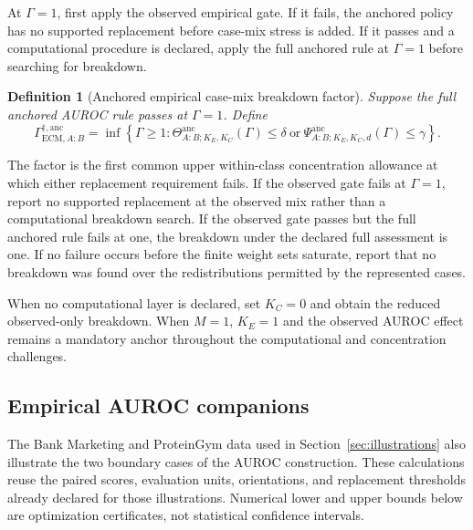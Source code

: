 \documentclass[11pt]{article}
\newcommand{\Psianc}{\Psi^{\mathrm{anc}}}
\newcommand{\Thetaanc}{\Theta^{\mathrm{anc}}}
\newtheorem{definition}{Definition}
\theoremstyle{remark}
\begin{document}
At $\Gamma=1$, first apply the observed empirical gate. If it fails, the
anchored policy has no supported replacement before case-mix stress is added.
If it passes and a computational procedure is declared, apply the full
anchored rule at $\Gamma=1$ before searching for breakdown.

\begin{definition}[Anchored empirical case-mix breakdown factor]
Suppose the full anchored AUROC rule passes at $\Gamma=1$. Define
\begin{equation}
\Gamma_{\mathrm{ECM},A:B}^{\dagger,\mathrm{anc}}
=
\inf\left\{\Gamma\geq1:
\Thetaanc_{A:B;K_E,K_C}(\Gamma)\leq\delta
\ \text{or}\ 
\Psianc_{A:B;K_E,K_C,d}(\Gamma)\leq\gamma
\right\}.
\label{eq:anchored-breakdown}
\end{equation}
\end{definition}

The factor is the first common upper within-class concentration allowance at
which either replacement requirement fails. If the observed gate fails at
$\Gamma=1$, report no supported replacement at the observed mix rather than a
computational breakdown search. If the observed gate passes but the full
anchored rule fails at one, the breakdown under the declared full assessment
is one. If no failure occurs before the finite weight sets saturate, report that
no breakdown was found over the redistributions permitted by the represented
cases.

When no computational layer is declared, set $K_C=0$ and obtain the reduced
observed-only breakdown. When $M=1$, $K_E=1$ and the observed AUROC effect
remains a mandatory anchor throughout the computational and concentration
challenges.

\subsection{Empirical AUROC companions}
\label{app:auroc-illustrations}

The Bank Marketing and ProteinGym data used in
Section~\ref{sec:illustrations} also illustrate the two boundary cases of the
AUROC construction. These calculations reuse the paired scores, evaluation
units, orientations, and replacement thresholds already declared for those
illustrations. Numerical lower and upper bounds below are optimization
certificates, not statistical confidence intervals.
\end{document}
